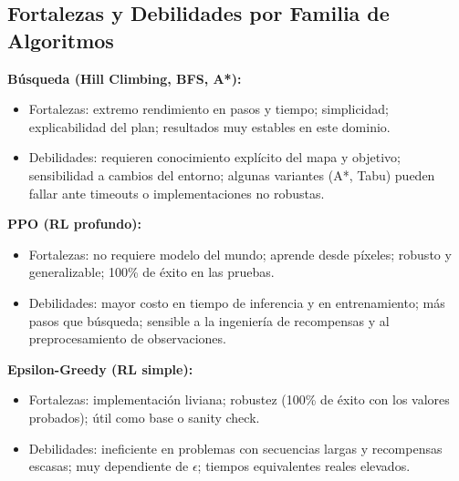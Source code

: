 \documentclass[12pt, oneside, openany]{book}
\begin{document}
\subsection{Fortalezas y Debilidades por Familia de Algoritmos}
\label{sec:pros_cons}
\noindent\textbf{Búsqueda (Hill Climbing, BFS, A*):}
\begin{itemize}[leftmargin=*]
    \item Fortalezas: extremo rendimiento en pasos y tiempo; simplicidad; explicabilidad del plan; resultados muy estables en este dominio.
    \item Debilidades: requieren conocimiento explícito del mapa y objetivo; sensibilidad a cambios del entorno; algunas variantes (A*, Tabu) pueden fallar ante timeouts o implementaciones no robustas.
\end{itemize}
\noindent\textbf{PPO (RL profundo):}
\begin{itemize}[leftmargin=*]
    \item Fortalezas: no requiere modelo del mundo; aprende desde píxeles; robusto y generalizable; 100\% de éxito en las pruebas.
    \item Debilidades: mayor costo en tiempo de inferencia y en entrenamiento; más pasos que búsqueda; sensible a la ingeniería de recompensas y al preprocesamiento de observaciones.
\end{itemize}
\noindent\textbf{Epsilon-Greedy (RL simple):}
\begin{itemize}[leftmargin=*]
    \item Fortalezas: implementación liviana; robustez (100\% de éxito con los valores probados); útil como base o sanity check.
    \item Debilidades: ineficiente en problemas con secuencias largas y recompensas escasas; muy dependiente de $\epsilon$; tiempos equivalentes reales elevados.
\end{itemize}
\end{document}
